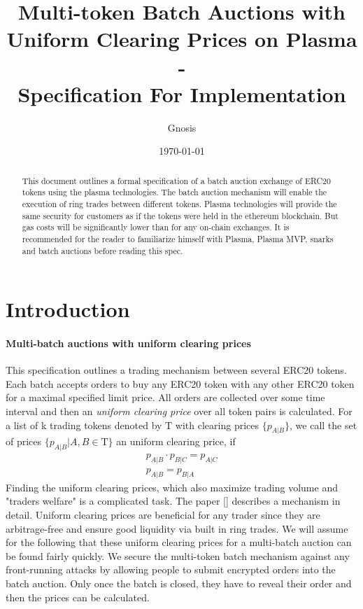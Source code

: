 \documentclass[11pt,parskip=full]{scrartcl}%
\title{
  Multi-token Batch Auctions with Uniform Clearing Prices on Plasma\\
  - \\
  \Large Specification For Implementation}
\author{Gnosis}
\date{\today}
\newcommand{\Tau}{\mathrm{T}}
\begin{document}
\maketitle


\begin{abstract}

This document outlines a formal specification of a batch auction exchange of ERC20 tokens using the plasma technologies. The batch auction mechanism will enable the execution of ring trades between different tokens. Plasma technologies will provide the same security for customers as if the tokens were held in the ethereum blockchain. But gas costs will be significantly lower than for any on-chain exchanges. It is recommended for the reader to familiarize himself with Plasma, Plasma MVP, snarks and batch auctions before reading this spec.

\end{abstract}

\tableofcontents

\newpage
\section{Introduction}
\label{sec:introduction}

\paragraph{Multi-batch auctions with uniform clearing prices}

This specification outlines a trading mechanism between several ERC20 tokens. Each batch accepts orders to buy any ERC20 token with any other ERC20 token for a maximal specified limit price. All orders are collected over some time interval and then an \emph{uniform clearing price} over all token pairs is calculated. 
For a list of k trading tokens denoted by $\Tau$ with clearing prices $\{p_{A|B}\}$, we call the set of prices $\{p_{A|B}| A,B \in \Tau \}$ an uniform clearing price, if
\begin{align}
  p_{A|B} \cdot p_{B|C} = p_{A|C}\\
  p_{A|B} = p_{B|A}
\end{align}
Finding the uniform clearing prices, which also maximize trading volume and "traders welfare" is a complicated task. The paper [] describes a mechanism in detail. Uniform clearing prices are beneficial for any trader since they are arbitrage-free and ensure good liquidity via built in ring trades. We will assume for the following that these uniform clearing prices for a multi-batch auction can be found fairly quickly. \newline
We secure the multi-token batch mechanism against any front-running attacks by allowing people to submit encrypted orders into the batch auction. Only once the batch is closed, they have to reveal their order and then the prices can be calculated. 
\end{document}
